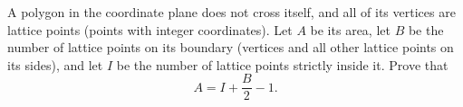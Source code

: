 A polygon in the coordinate plane does not cross itself, and all of its vertices are lattice points (points with integer coordinates). Let $A$ be its area, let $B$ be the number of lattice points on its boundary (vertices and all other lattice points on its sides), and let $I$ be the number of lattice points strictly inside it. Prove that
\[
A=I+\dfrac{B}{2}-1 .
\]
